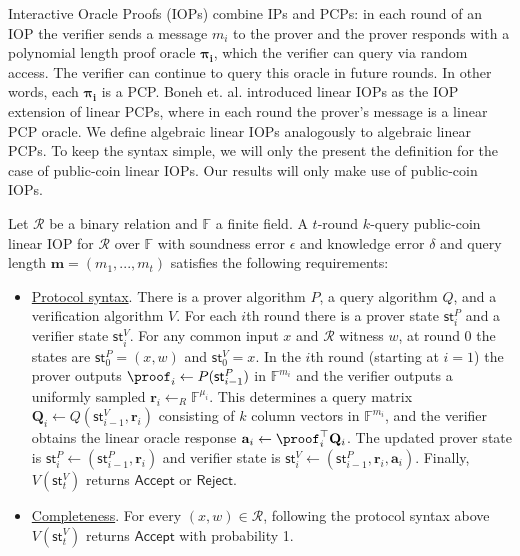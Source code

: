 Interactive Oracle Proofs (IOPs) \cite{BCS16, RRR16} combine IPs and PCPs: in each round of an IOP the verifier sends a message $m_i$ to the prover and the prover responds with a polynomial length proof oracle $\boldsymbol{\pi_i}$, which the verifier can query via random access. The verifier can continue to query this oracle in future rounds. In other words, each $\boldsymbol{\pi_i}$ is a PCP. Boneh et. al. \cite{IshaiCorrigan} introduced linear IOPs as the IOP extension of linear PCPs, where in each round the prover's message is a linear PCP oracle. We define algebraic linear IOPs analogously to algebraic linear PCPs. To keep the syntax simple, we will only the present the definition for the case of public-coin linear IOPs. Our results will only make use of public-coin IOPs. 

\begin{definition} 
\label{def:linearIOP}
Let $\mathcal{R}$ be a binary relation and $\mathbb{F}$ a finite field. A $t$-round $k$-query public-coin linear IOP for $\mathcal{R}$ over $\mathbb{F}$ with soundness error $\epsilon$ and knowledge error $\delta$ and query length $\mathbf{m} = (m_1,...,m_t)$ satisfies the following requirements: 

\begin{itemize} 
\item \underline{Protocol syntax}. There is a prover algorithm $P$, a query algorithm $Q$, and a verification algorithm $V$. For each $i$th round there is a prover state $\textsf{st}^P_i$ and a verifier state $\textsf{st}^V_i$. For any common input $x$ and $\mathcal{R}$ witness $w$, at round 0 the states are $\textsf{st}^P_0 = (x, w)$ and $\textsf{st}^V_0 = x$. 
In the $i$th round (starting at $i = 1$) the prover outputs $\proof_i \leftarrow P(\textsf{st}^P_{i-1})$ in $\mathbb{F}^{m_i}$ and the verifier outputs a uniformly sampled $\mathbf{r}_i \leftarrow_R \mathbb{F}^{\mu_i}$. 
This determines a query matrix $\mathbf{Q}_i \leftarrow Q(\textsf{st}^V_{i-1}, \mathbf{r}_i)$ consisting of $k$ column vectors in $\mathbb{F}^{m_i}$, and the verifier obtains the linear oracle response $\mathbf{a}_i \leftarrow \proof_i^\top \mathbf{Q}_i$. The updated prover state is $\textsf{st}^P_i \leftarrow (\textsf{st}^P_{i-1}, \mathbf{r}_i)$ and verifier state is $\textsf{st}^V_i \leftarrow (\textsf{st}^P_{i-1}, \mathbf{r}_i, \mathbf{a}_i)$. Finally, $V(\textsf{st}^V_t)$ returns $\textsf{Accept}$ or $\textsf{Reject}$.

\item \underline{Completeness}. For every $(x, w) \in \mathcal{R}$, following the protocol syntax above $V(\textsf{st}^V_t)$ returns $\textsf{Accept}$ with probability 1. 


\end{itemize}
\end{definition}
